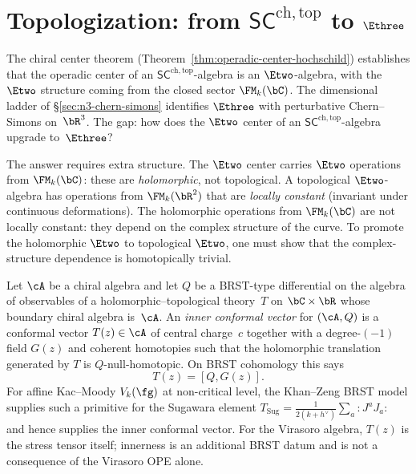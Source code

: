 
\section{Topologization: from
\texorpdfstring{$\mathsf{SC}^{\mathrm{ch,top}}$}{SC} to
\texorpdfstring{$\Ethree$}{E3}}
\label{sec:topologization}

The chiral center theorem
(Theorem~\ref{thm:operadic-center-hochschild}) establishes
that the operadic center of an
$\mathsf{SC}^{\mathrm{ch,top}}$-algebra is an $\Etwo$-algebra,
with the $\Etwo$ structure coming from the closed sector
$\FM_k(\bC)$. The dimensional ladder of
\S\ref{sec:n3-chern-simons} identifies $\Ethree$ with
perturbative Chern--Simons on~$\bR^3$. The gap: how does the
$\Etwo$ center of an $\mathsf{SC}^{\mathrm{ch,top}}$-algebra
upgrade to~$\Ethree$?

The answer requires extra structure. The
$\Etwo$ center carries $\Etwo$ operations from
$\FM_k(\bC)$: these are \emph{holomorphic}, not topological.
A topological $\Etwo$-algebra has operations from
$\FM_k(\bR^2)$ that are \emph{locally constant} (invariant
under continuous deformations). The holomorphic operations
from $\FM_k(\bC)$ are not locally constant: they depend on
the complex structure of the curve. To promote the
holomorphic $\Etwo$ to topological $\Etwo$, one must show
that the complex-structure dependence is homotopically
trivial.

\begin{definition}
\label{def:inner-conformal-vector}
Let $\cA$ be a chiral algebra and let $Q$ be a
BRST-type differential on the algebra of observables
of a holomorphic--topological theory~$T$ on
$\bC \times \bR$ whose boundary chiral algebra
is~$\cA$. An \emph{inner conformal vector} for
$(\cA, Q)$ is a conformal vector $T(z) \in \cA$ of
central charge~$c$ together with a degree-$(-1)$ field
$G(z)$ and coherent homotopies such that the holomorphic
translation generated by $T$ is $Q$-null-homotopic. On
BRST cohomology this says
\[
        T(z)=[Q,G(z)] .
\]
For affine Kac--Moody $V_k(\fg)$ at non-critical level,
the Khan--Zeng BRST model supplies such a primitive for the
Sugawara element
$T_{\mathrm{Sug}} = \frac{1}{2(k + h^\vee)}
\sum_a {:}J^a J_a{:}$
and hence supplies the inner conformal vector. For the
Virasoro algebra, $T(z)$ is the stress tensor itself; innerness
is an additional BRST datum and is not a consequence of the
Virasoro OPE alone.
\end{definition}

